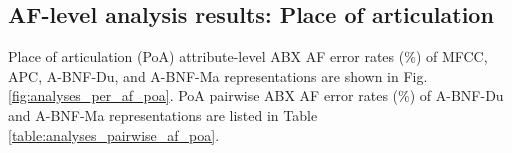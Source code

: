 \documentclass[transmag]{IEEEtran}
\begin{document}


\subsection{AF-level analysis results: Place of articulation}
Place of articulation (PoA) attribute-level ABX AF error rates ($\%$) of MFCC, APC, A-BNF-Du, and A-BNF-Ma representations are shown in Fig. \ref{fig:analyses_per_af_poa}. PoA pairwise ABX AF error rates ($\%$) of A-BNF-Du and A-BNF-Ma representations are listed in Table \ref{table:analyses_pairwise_af_poa}.

\end{document}
